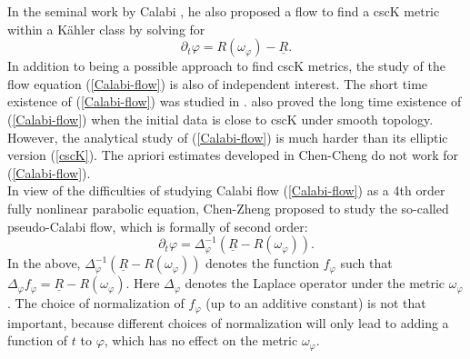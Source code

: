 \documentclass[11pt]{amsart}
\numberwithin{equation}{section}
\begin{document}
In the seminal work by Calabi \cite{calabi82},  he also proposed a flow to find a cscK metric within a K\"ahler class by solving for 
\begin{equation}\label{Calabi-flow}
\partial_t\varphi=R(\omega_{\varphi})-\underline{R}.
\end{equation}
In addition to being a possible approach to find cscK metrics,  the study of the flow equation (\ref{Calabi-flow}) is also of independent interest.  The short time existence of (\ref{Calabi-flow}) was studied in \cite{chenhe05}.  \cite{chenhe05} also proved the long time existence of (\ref{Calabi-flow}) when the initial data is close to cscK under smooth topology.  
However,  the analytical study of (\ref{Calabi-flow}) is much harder than its elliptic version (\ref{cscK}).  The apriori estimates developed in Chen-Cheng \cite{cc1} do not work for (\ref{Calabi-flow}).  \\

In view of the difficulties of studying Calabi flow (\ref{Calabi-flow}) as a 4th order fully nonlinear parabolic equation,  Chen-Zheng \cite{Chen-Zheng} proposed to study the so-called pseudo-Calabi flow,  which is formally of second order:
\begin{equation}\label{PCF}
\partial_t\varphi=\Delta_{\varphi}^{-1}(\underline{R}-R(\omega_{\varphi})).
\end{equation}
In the above,  $\Delta_{\varphi}^{-1}(\underline{R}-R(\omega_{\varphi}))$ denotes the function $f_{\varphi}$ such that $\Delta_{\varphi}f_{\varphi}=\underline{R}-R(\omega_{\varphi})$.  
Here $\Delta_{\varphi}$ denotes the Laplace operator under the metric $\omega_{\varphi}$.  The choice of normalization of $f_{\varphi}$ (up to an additive constant) is not that important,  because different choices of normalization will only lead to adding a function of $t$ to $\varphi$,  which has no effect on the metric $\omega_{\varphi}$.
\end{document}
